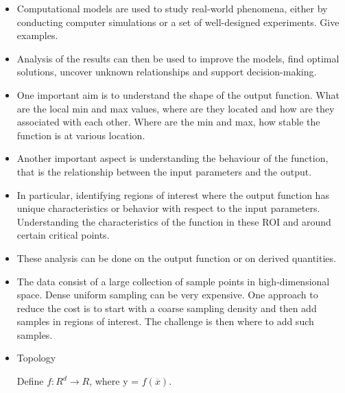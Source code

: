 \maketitle
\label{sec:intro}
\begin{itemize}[topsep=0cm, itemsep=0ex, parsep=0cm]
    \item Computational models are used to study real-world phenomena, either by conducting computer simulations or a set of well-designed experiments. Give examples.
    
    \item Analysis of the results can then be used to improve the models, find optimal solutions, uncover unknown relationships and support decision-making.
        
    \item One important aim is to understand the shape of the output function. What are the local min and max values, where are they located and how are they associated with each other. Where are the min and max, how stable the function is at various location.
    
    \item Another important aspect is understanding the behaviour of the function, that is the relationship between the input parameters and the output.
    
    \item In particular, identifying regions of interest where the output function has unique characteristics or behavior with respect to the input parameters. Understanding the characteristics of the function in these ROI and around certain critical points.
    
    \item These analysis can be done on the output function or on derived quantities.
    
    \item The data consist of a large collection of sample points in high-dimensional space. Dense uniform sampling can be very expensive. One approach to reduce the cost is to start with a coarse sampling density and then add samples in regions of interest. The challenge is then where to add such samples.
    
    \item Topology
    
    Define $f: R^d \rightarrow R$, where y = $f(\overline{x})$. 
    

\end{itemize}
